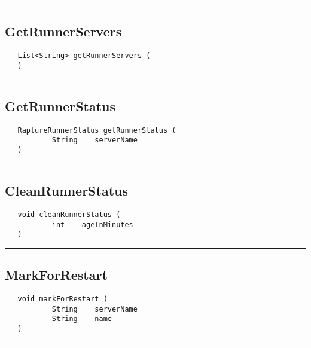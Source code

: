 \rule{15cm}{2pt}
\subsection{GetRunnerServers}
\label{Api:GetRunnerServers}
\begin{verbatim}
   List<String> getRunnerServers (
   )
\end{verbatim}



\rule{15cm}{2pt}
\subsection{GetRunnerStatus}
\label{Api:GetRunnerStatus}
\begin{verbatim}
   RaptureRunnerStatus getRunnerStatus (
           String    serverName
   )
\end{verbatim}



\rule{15cm}{2pt}
\subsection{CleanRunnerStatus}
\label{Api:CleanRunnerStatus}
\begin{verbatim}
   void cleanRunnerStatus (
           int    ageInMinutes
   )
\end{verbatim}



\rule{15cm}{2pt}
\subsection{MarkForRestart}
\label{Api:MarkForRestart}
\begin{verbatim}
   void markForRestart (
           String    serverName
           String    name
   )
\end{verbatim}



\rule{15cm}{2pt}
